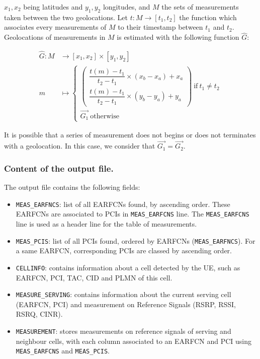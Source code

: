 \documentclass[a4paper, 11pt]{report}
\begin{document}
    $x_1, x_2$ being latitudes and $y_1, y_2$ longitudes, and $M$ the sets of measurements taken between the two geolocations. Let $t: M \to \left[t_1, t_2\right]$ the function which associates every measurements of $M$ to their timestamp between $t_1$ and $t_2$. Geolocations of measurements in $M$ is estimated with the following function $\hat{G}$:
    
    \begin{align}
        \hat{G}\colon M & \longrightarrow \left[x_1, x_2\right] \times \left[y_1, y_2\right] \\[5pt]
        m & \longmapsto \begin{cases}
            \begin{pmatrix}
                \dfrac{t(m) - t_1}{t_2 - t_1} \times \left(x_b - x_a\right) + x_a\\[15pt]
                \dfrac{t(m) - t_1}{t_2 - t_1} \times \left(y_b - y_a\right) + y_a
            \end{pmatrix} \ \text{if} \ t_1 \neq t_2 \\[30pt]
            \overrightarrow{G_1} \ \text{otherwise}
        \end{cases}
    \end{align}
    
    It is possible that a series of measurement does not begins or does not terminates with a geolocation. In this case, we consider that $\overrightarrow{G_1} = \overrightarrow{G_2}$.
    
    \subsubsection{Content of the output file.}
    The output file contains the following fields:
    
    \begin{itemize}
        \item \texttt{MEAS\_EARFNCS}: list of all EARFCNs found, by ascending order. These EARFCNs are associated to PCIs in \texttt{MEAS\_EARFCNS} line. The \texttt{MEAS\_EARFCNS} line is used as a header line for the table of measurements.
        \item \texttt{MEAS\_PCIS}: list of all PCIs found, ordered by EARFCNs (\texttt{MEAS\_EARFNCS}). For a same EARFCN, corresponding PCIs are classed by ascending order.
        \item \texttt{CELLINFO}: contains information about a cell detected by the UE, such as EARFCN, PCI, TAC, CID and PLMN of this cell.
        \item \texttt{MEASURE\_SERVING}: contains information about the current serving cell (EARFCN, PCI) and measurement on Reference Signals (RSRP, RSSI, RSRQ, CINR).
        \item \texttt{MEASUREMENT}: stores measurements on reference signals of serving and neighbour cells, with each column associated to an EARFCN and PCI using \texttt{MEAS\_EARFCNS} and \texttt{MEAS\_PCIS}.
    \end{itemize}
    
\end{document}
